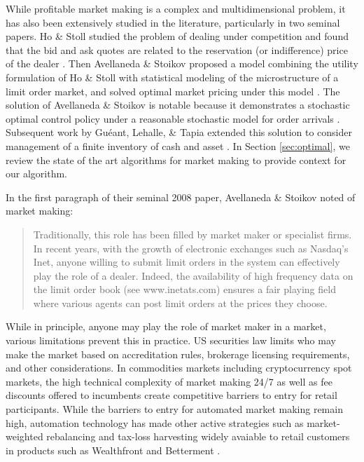 \documentclass{article}
\begin{document}
While profitable market making is a complex and multidimensional problem, it has also been extensively studied in the literature, particularly in two seminal papers. Ho \& Stoll studied the problem of dealing under competition and found that the bid and ask quotes are related to the reservation (or indifference) price of the dealer \cite{ho1980on}. Then Avellaneda \& Stoikov proposed a model combining the utility formulation of Ho \& Stoll with statistical modeling of the microstructure of a limit order market, and solved optimal market pricing under this model \cite{avellaneda2008high}. The solution of Avellaneda \& Stoikov is notable because it demonstrates a stochastic optimal control policy under a reasonable stochastic model for order arrivals \cite{bouchard2002statistical}. Subsequent work by Guéant, Lehalle, \& Tapia extended this solution to consider management of a finite inventory of cash and asset \cite{guéant2012dealing}. In Section \ref{sec:optimal}, we review the state of the art algorithms for market making to provide context for our algorithm.

In the first paragraph of their seminal 2008 paper, Avellaneda \& Stoikov noted of market making:

\begin{quote}
Traditionally, this role has been filled by market maker or specialist firms. In recent years, with the growth of electronic exchanges such as Nasdaq’s Inet, anyone willing to submit limit orders in the system can effectively play the role of a dealer. Indeed, the availability of high frequency data on the limit order book (see www.inetats.com) ensures a fair playing field where various agents can post limit orders at the prices they choose.
\end{quote}

While in principle, anyone may play the role of market maker in a market, various limitations prevent this in practice. US securities law limits who may make the market based on accreditation rules, brokerage licensing requirements, and other considerations. In commodities markets including cryptocurrency spot markets, the high technical complexity of market making 24/7 as well as fee discounts offered to incumbents create competitive barriers to entry for retail participants. While the barriers to entry for automated market making remain high, automation technology has made other active strategies such as market-weighted rebalancing and tax-loss harvesting widely avaiable to retail customers in products such as Wealthfront and Betterment \cite{wealthfront, betterment}.
\end{document}
